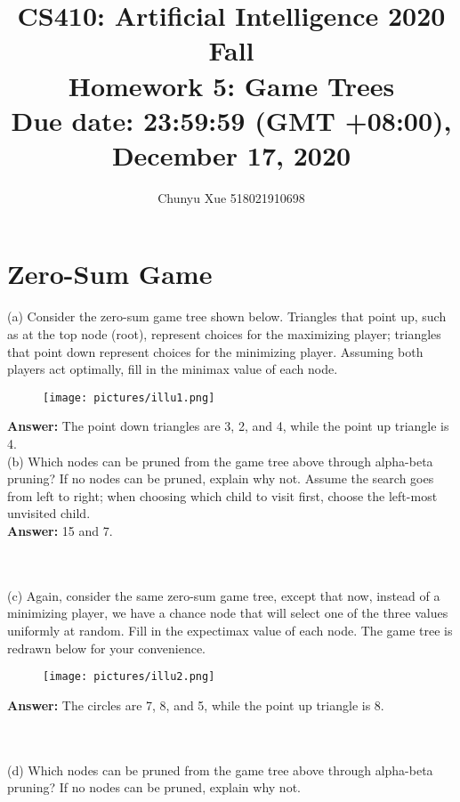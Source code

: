 \documentclass{article}
\title{\normalsize
CS410: Artificial Intelligence 2020 Fall\\
Homework 5: Game Trees\\
Due date: 23:59:59 (GMT +08:00), December 17, 2020}
\author{Chunyu Xue 518021910698}
\date{}
\begin{document}
 
\maketitle

\section{Zero-Sum Game}
\noindent (a) Consider the zero-sum game tree shown below. Triangles that point up, such as at the top node (root), represent choices for the maximizing player; triangles that point down represent choices for the minimizing player. Assuming both players act optimally, fill in the minimax value of each node.

\begin{figure}[h]
\centering
\texttt{[image: pictures/illu1.png]}
\end{figure}

\textbf{Answer:} The point down triangles are 3, 2, and 4, while the point up triangle is 4. \\


\noindent (b) Which nodes can be pruned from the game tree above through alpha-beta pruning? If no nodes can be pruned, explain why not. Assume the search goes from left to right; when choosing which child to visit first, choose the left-most unvisited child. \\

\textbf{Answer:} 15 and 7.

~\\
~\\

\newpage
\noindent (c) Again, consider the same zero-sum game tree, except that now, instead of a minimizing player, we have a chance node that will select one of the three values uniformly at random. Fill in the expectimax value of each node. The game tree is redrawn below for your convenience.

\begin{figure}[h]
\centering
\texttt{[image: pictures/illu2.png]}
\end{figure}

\textbf{Answer:} The circles are 7, 8, and 5, while the point up triangle is 8. 

~\\
~\\
(d) Which nodes can be pruned from the game tree above through alpha-beta pruning? If no nodes can be pruned, explain why not.
\end{document}
